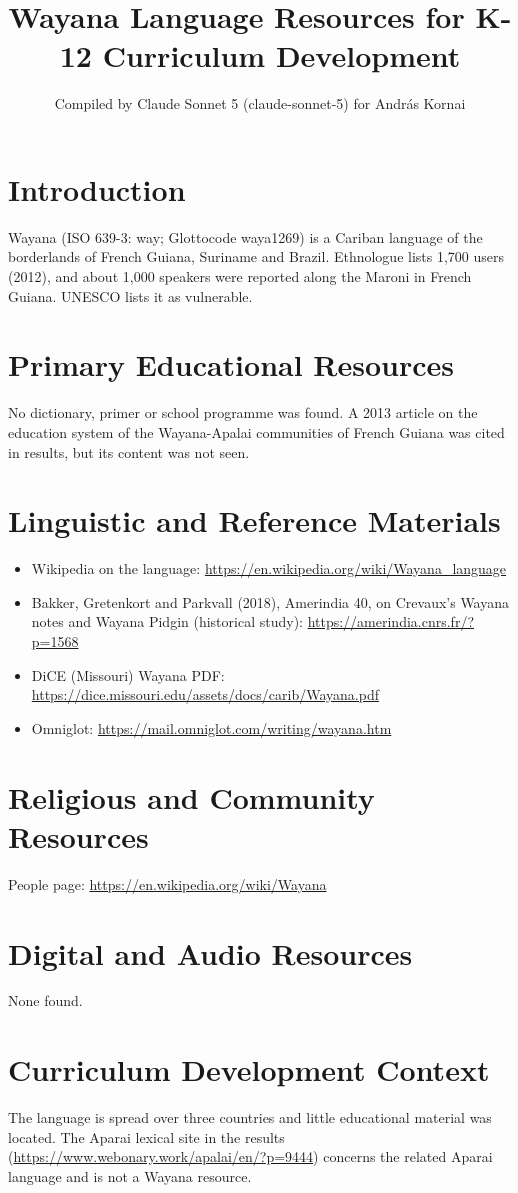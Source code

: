 \documentclass[12pt]{article}
\title{Wayana Language Resources for K-12 Curriculum Development}
\author{Compiled by Claude Sonnet 5 (claude-sonnet-5) for Andr\'as Kornai}
\date{}
\begin{document}
\maketitle
\section{Introduction}
Wayana (ISO 639-3: way; Glottocode waya1269) is a Cariban language of the borderlands of French Guiana, Suriname and Brazil. Ethnologue lists 1,700 users (2012), and about 1,000 speakers were reported along the Maroni in French Guiana. UNESCO lists it as vulnerable.
\section{Primary Educational Resources}
No dictionary, primer or school programme was found. A 2013 article on the education system of the Wayana-Apalai communities of French Guiana was cited in results, but its content was not seen.
\section{Linguistic and Reference Materials}
\begin{itemize}
\item Wikipedia on the language: \url{https://en.wikipedia.org/wiki/Wayana_language}
\item Bakker, Gretenkort and Parkvall (2018), Amerindia 40, on Crevaux's Wayana notes and Wayana Pidgin (historical study): \url{https://amerindia.cnrs.fr/?p=1568}
\item DiCE (Missouri) Wayana PDF: \url{https://dice.missouri.edu/assets/docs/carib/Wayana.pdf}
\item Omniglot: \url{https://mail.omniglot.com/writing/wayana.htm}
\end{itemize}
\section{Religious and Community Resources}
People page: \url{https://en.wikipedia.org/wiki/Wayana}
\section{Digital and Audio Resources}
None found.
\section{Curriculum Development Context}
The language is spread over three countries and little educational material was located. The Aparai lexical site in the results (\url{https://www.webonary.work/apalai/en/?p=9444}) concerns the related Aparai language and is not a Wayana resource.
\end{document}
